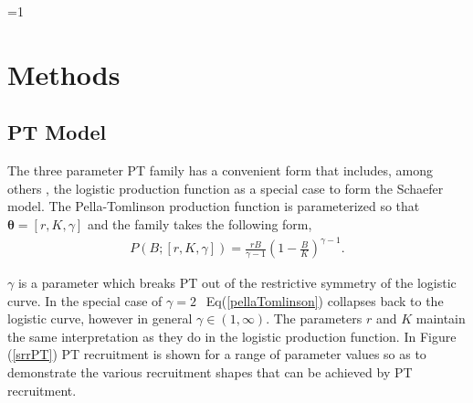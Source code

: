 \documentclass[12pt]{article}
\newcounter{alphasect}
\def\alphainsection{0}
\let\oldsection=\section
\def\section{%
  \ifnum\alphainsection=1%
    \addtocounter{alphasect}{1}
  \fi%
\oldsection}%
\begin{document}
%



%
\section{Methods}


%
\subsection{PT Model}

The three parameter PT family has a convenient form that includes, among 
others , the 
logistic production function as a special case to form the Schaefer model. The 
Pella-Tomlinson production function is parameterized so that $\bm{\theta} = [r, K, \gamma]$ 
and the family takes the following form, 
\begin{align}
P(B; [r, K, \gamma]) = \frac{r B}{\gamma-1} \left(1-\frac{B}{K}\right)^{\gamma-1}. \label{pellaTomlinson}
\end{align}
%

%
$\gamma$ is a parameter which breaks PT out of the restrictive symmetry of the 
logistic curve. In the special case of $\gamma=2~~$ Eq(\ref{pellaTomlinson}) 
collapses back to the logistic curve, however in general $\gamma\in(1, \infty)$.
The parameters $r$ and $K$ maintain the same interpretation as 
they do in the logistic production function. In Figure (\ref{srrPT}) PT recruitment 
is shown for a range of parameter values so as to demonstrate the various 
recruitment shapes that can be achieved by PT recruitment.  
\end{document}
